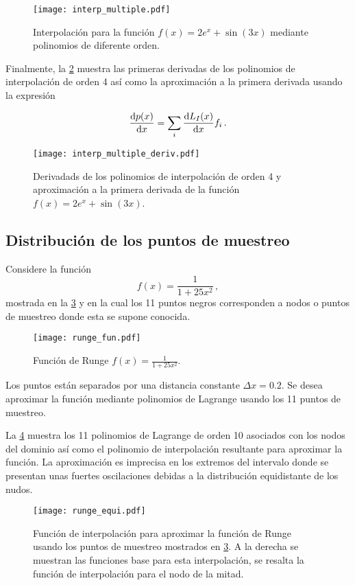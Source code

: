 \begin{figure}[H]
\centering
  \texttt{[image: interp\_multiple.pdf]}
  \caption{Interpolación para la función $f(x) = 2e^{x} + \sin(3x)$ mediante polinomios de diferente orden.}
\label{fig:interp_multiple}
\end{figure}

Finalmente, la \cref{fig:interp_multiple_deriv} muestra las primeras derivadas de los polinomios de interpolación de orden 4 así como la aproximación a la primera derivada usando la expresión

\[\dv{p(x)}{x} = \sum_{i} \dv{L_I(x)}{x} f_i \, .\]

\begin{figure}[H]
  \centering
  \texttt{[image: interp\_multiple\_deriv.pdf]}
  \caption{Derivadads de los polinomios de interpolación de orden 4 y aproximación a la primera derivada de la función $f(x) = 2e^{x} + \sin(3x)$.}
\label{fig:interp_multiple_deriv}
\end{figure}

\subsection{Distribución de los puntos de muestreo}
Considere la función
\[f(x) = \frac{1}{1 + 25 x^2}\, ,\]
mostrada en la \cref{fig:runge_fun} y en la cual los 11 puntos negros corresponden a nodos o puntos de muestreo donde esta se supone conocida.
\begin{figure}[h]
\centering
\texttt{[image: runge\_fun.pdf]}
\caption{Función de Runge $f(x) = \frac{1}{1 + 25{x^2}}$.}
\label{fig:runge_fun}
\end{figure}

Los puntos están separados por una distancia constante $\Delta x = 0.2$. Se desea aproximar la función mediante polinomios de Lagrange usando los 11 puntos de muestreo.

La \cref{fig:runge_equi} muestra los 11 polinomios de Lagrange de orden 10 asociados con los nodos del dominio así como el polinomio de interpolación resultante para aproximar la función. La aproximación es imprecisa en los extremos del intervalo donde se presentan unas fuertes oscilaciones debidas a la distribución equidistante de los nudos.
\begin{figure}[H]
  \centering
  \texttt{[image: runge\_equi.pdf]}
\caption{Función de interpolación para aproximar la función de Runge usando los puntos de muestreo mostrados en \cref{fig:runge_fun}. A la derecha se muestran las funciones base para esta interpolación, se resalta la función de interpolación para el nodo de la mitad.}
\label{fig:runge_equi}
\end{figure}


